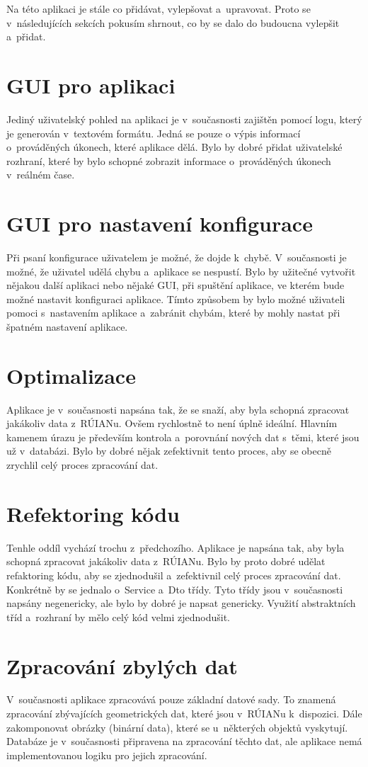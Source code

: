\label{cha:NavrhDoBudoucna}
Na této aplikaci je stále co přidávat, vylepšovat a~upravovat.
Proto se v~následujících sekcích pokusím shrnout, co by se 
dalo do budoucna vylepšit a~přidat.

\section*{GUI pro aplikaci}
Jediný uživatelský pohled na aplikaci je v~současnosti zajištěn pomocí 
logu, který je generován v~textovém formátu. Jedná se pouze o výpis
informací o~prováděných úkonech, které aplikace dělá.
Bylo by dobré přidat uživatelské rozhraní, které by bylo schopné
zobrazit informace o~prováděných úkonech v~reálném čase.

\section*{GUI pro nastavení konfigurace}
Při psaní konfigurace uživatelem je možné, že dojde k~chybě.
V~současnosti je možné, že uživatel udělá chybu a~aplikace se
nespustí. Bylo by užitečné vytvořit nějakou další aplikaci nebo nějaké GUI,
při spuštění aplikace, ve kterém bude možné nastavit konfiguraci aplikace.
Tímto způsobem by bylo možné uživateli pomoci s~nastavením aplikace
a~zabránit chybám, které by mohly nastat při špatném nastavení aplikace.

\section*{Optimalizace}
Aplikace je v~současnosti napsána tak, že se snaží, aby byla schopná
zpracovat jakákoliv data z~RÚIANu. Ovšem rychlostně to není
úplně ideální. Hlavním kamenem úrazu je především kontrola
a~porovnání nových dat s~těmi, které jsou už v~databázi.
Bylo by dobré nějak zefektivnit tento proces, aby se obecně zrychlil
celý proces zpracování dat.

\section*{Refektoring kódu}
Tenhle oddíl vychází trochu z~předchozího. Aplikace je napsána
tak, aby byla schopná zpracovat jakákoliv data z~RÚIANu.
Bylo by proto dobré udělat refaktoring kódu, aby se zjednodušil
a~zefektivnil celý proces zpracování dat. Konkrétně by se jednalo
o~Service a~Dto třídy. Tyto třídy jsou v~současnosti napsány
negenericky, ale bylo by dobré je napsat genericky.
Využití abstraktních tříd a~rozhraní by mělo celý kód velmi
zjednodušit.

\section*{Zpracování zbylých dat}
V~současnosti aplikace zpracovává pouze základní datové sady.
To znamená zpracování zbývajících geometrických dat, které jsou
v~RÚIANu k~dispozici. Dále zakomponovat obrázky (binární data),
které se u~některých objektů vyskytují.
Databáze je v~současnosti připravena na zpracování těchto dat,
ale aplikace nemá implementovanou logiku pro jejich zpracování.